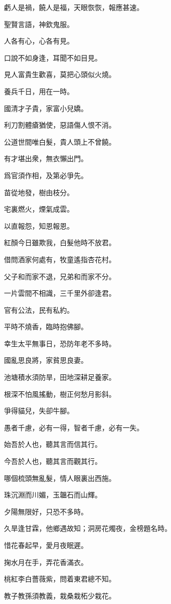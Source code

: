 \documentclass[12pt,a4paper]{ctexbook}
\begin{document}
虧人是禍，饒人是福，天眼恢恢，報應甚速。\par
聖賢言語，神欽鬼服。\par
人各有心，心各有見。\par
口說不如身逢，耳聞不如目見。\par
見人富貴生歡喜，莫把心頭似火燒。\par
養兵千日，用在一時。\par
國清才子貴，家富小兒嬌。\par
利刀割體瘡猶使，惡語傷人恨不消。\par
公道世間唯白髮，貴人頭上不曾饒。\par
有才堪出衆，無衣懶出門。\par
爲官須作相，及第必爭先。\par
苗從地發，樹由枝分。\par
宅裏燃火，煙氣成雲。\par
以直報怨，知恩報恩。\par
紅顏今日雖欺我，白髮他時不放君。\par
借問酒家何處有，牧童遙指杏花村。\par
父子和而家不退，兄弟和而家不分。\par
一片雲間不相識，三千里外卻逢君。\par
官有公法，民有私約。\par
平時不燒香，臨時抱佛腳。\par
幸生太平無事日，恐防年老不多時。\par
國亂思良將，家貧思良妻。\par
池塘積水須防旱，田地深耕足養家。\par
根深不怕風搖動，樹正何愁月影斜。\par
爭得貓兒，失卻牛腳。\par
愚者千慮，必有一得，智者千慮，必有一失。\par
始吾於人也，聽其言而信其行。\par
今吾於人也，聽其言而觀其行。\par
哪個梳頭無亂髮，情人眼裏出西施。\par
珠沉淵而川媚，玉韞石而山輝。\par
夕陽無限好，只恐不多時。\par
久旱逢甘霖，他鄉遇故知；洞房花燭夜，金榜題名時。\par
惜花春起早，愛月夜眠遲。\par
掬水月在手，弄花香滿衣。\par
桃紅李白薔薇紫，問着東君總不知。\par
教子教孫須教義，栽桑栽柘少栽花。\par
\end{document}

